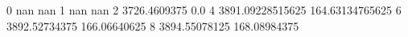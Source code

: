 0 nan nan
1 nan nan
2 3726.4609375 0.0
4 3891.09228515625 164.63134765625
6 3892.52734375 166.06640625
8 3894.55078125 168.08984375
